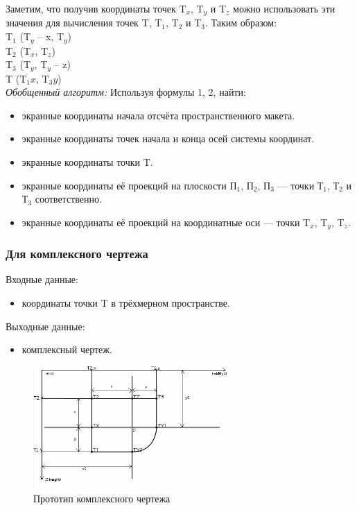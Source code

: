 \documentclass[13pt]{extarticle}
\begin{document}
	Заметим, что получив координаты точек T$_x$, T$_y$ и  T$_z$ можно использовать эти значения для вычисления точек T, T$_1$, T$_2$ и T$_3$. Таким образом:\\
	T$_1$ (T$_y$ -- x, T$_y$)\\
	T$_2$ (T$_x$, T$_z$)\\
	T$_3$ (T$_y$, T$_y$ -- z)\\
	T (T$_1x$, T$_3y$)
	\\
	
\emph{Обобщенный алгоритм:}
Используя формулы 1, 2, найти:
	\begin{itemize}
		\item экранные координаты начала отсчёта пространственного макета.
		\item экранные координаты точек начала и конца осей системы координат.
		\item экранные координаты точки T.
		\item экранные координаты её проекций на плоскости П$_1$, П$_2$, П$_3$ — точки Т$_1$, Т$_2$ и Т$_3$ соответственно.
		\item экранные координаты её проекций на координатные оси — точки T$_x$, T$_y$, T$_z$.
	\end{itemize}

\subsubsection{Для комплексного чертежа}
Входные данные:
	\begin{itemize}
		\item координаты точки T в трёхмерном пространстве.
	\end{itemize}
	
Выходные данные:
	
	\begin{itemize}
		\item комплексный чертеж.
	\end{itemize}
	
	\begin{figure} 
		\includegraphics[width=0.67\textwidth]{Images/complexDrawingPrototype}
		\caption{Прототип комплексного чертежа}
		\label{fig:complDrawProto}
	\end{figure}
	
\end{document}
